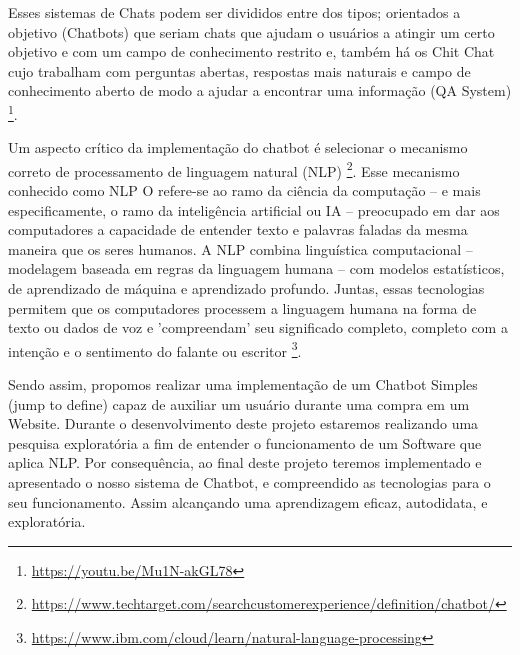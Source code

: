 \documentclass[
	12pt,				%
	openright,			%
	twoside,			%
	a4paper,			%
	english,			%
	french,				%
	spanish,			%
	brazil				%
	]{abntex2}
\begin{document}
Esses sistemas de Chats podem ser divididos entre dos tipos; orientados a objetivo (Chatbots) que seriam chats que ajudam o usuários a atingir um certo objetivo e com um campo de conhecimento restrito e, também há os Chit Chat cujo trabalham com perguntas abertas, respostas mais naturais e campo de conhecimento aberto de modo a ajudar a encontrar uma informação (QA System) \footnote{\url{https://youtu.be/Mu1N-akGL78}}.

Um aspecto crítico da implementação do chatbot é selecionar o mecanismo correto de processamento de linguagem natural (NLP) \footnote{\url{https://www.techtarget.com/searchcustomerexperience/definition/chatbot/}}.
Esse mecanismo conhecido como NLP O refere-se ao ramo da ciência da computação – e mais especificamente, o ramo da inteligência artificial ou IA – preocupado em dar aos computadores a capacidade de entender texto e palavras faladas da mesma maneira que os seres humanos.
A NLP combina linguística computacional – modelagem baseada em regras da linguagem humana – com modelos estatísticos, de aprendizado de máquina e aprendizado profundo. Juntas, essas tecnologias permitem que os computadores processem a linguagem humana na forma de texto ou dados de voz e 'compreendam' seu significado completo, completo com a intenção e o sentimento do falante ou escritor \footnote{\url{https://www.ibm.com/cloud/learn/natural-language-processing}}.

Sendo assim, propomos realizar uma implementação de um Chatbot Simples (jump to define) capaz de auxiliar um usuário durante uma compra em um Website. Durante o desenvolvimento deste projeto estaremos realizando uma pesquisa exploratória a fim de entender o funcionamento de um Software que aplica NLP.
Por consequência, ao final deste projeto teremos implementado e apresentado o nosso sistema de Chatbot, e compreendido as tecnologias para o seu funcionamento. Assim alcançando uma aprendizagem eficaz, autodidata, e exploratória.




%

\end{document}
